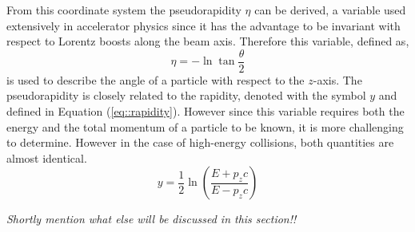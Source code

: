 From this coordinate system the pseudorapidity $\eta$ can be derived, a variable used extensively in accelerator physics since it has the advantage to be invariant with respect to Lorentz boosts along the beam axis. Therefore this variable, defined as,
\begin{equation} \label{eq::PseudoRapidity}
 \eta = - \ln \tan \frac{\theta}{2}
\end{equation}
is used to describe the angle of a particle with respect to the $z$-axis. The pseudorapidity is closely related to the rapidity, denoted with the symbol $y$ and defined in Equation (\ref{eq::rapidity}). However since this variable requires both the energy and the total momentum of a particle to be known, it is more challenging to determine. However in the case of high-energy collisions, both quantities are almost identical.
\begin{equation}\label{eq::rapidity}
 y = \frac{1}{2} \ln \left( \frac{E+p_{z}c}{E - p_{z}c} \right)
\end{equation}

\textit{Shortly mention what else will be discussed in this section!!}

